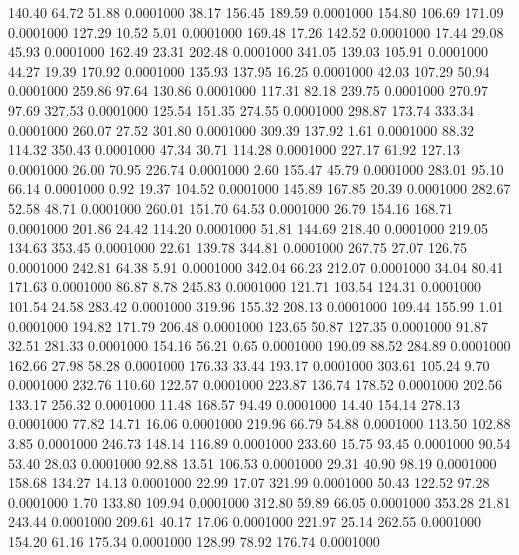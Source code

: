  140.40   64.72   51.88   0.0001000
  38.17  156.45  189.59   0.0001000
 154.80  106.69  171.09   0.0001000
 127.29   10.52    5.01   0.0001000
 169.48   17.26  142.52   0.0001000
  17.44   29.08   45.93   0.0001000
 162.49   23.31  202.48   0.0001000
 341.05  139.03  105.91   0.0001000
  44.27   19.39  170.92   0.0001000
 135.93  137.95   16.25   0.0001000
  42.03  107.29   50.94   0.0001000
 259.86   97.64  130.86   0.0001000
 117.31   82.18  239.75   0.0001000
 270.97   97.69  327.53   0.0001000
 125.54  151.35  274.55   0.0001000
 298.87  173.74  333.34   0.0001000
 260.07   27.52  301.80   0.0001000
 309.39  137.92    1.61   0.0001000
  88.32  114.32  350.43   0.0001000
  47.34   30.71  114.28   0.0001000
 227.17   61.92  127.13   0.0001000
  26.00   70.95  226.74   0.0001000
   2.60  155.47   45.79   0.0001000
 283.01   95.10   66.14   0.0001000
   0.92   19.37  104.52   0.0001000
 145.89  167.85   20.39   0.0001000
 282.67   52.58   48.71   0.0001000
 260.01  151.70   64.53   0.0001000
  26.79  154.16  168.71   0.0001000
 201.86   24.42  114.20   0.0001000
  51.81  144.69  218.40   0.0001000
 219.05  134.63  353.45   0.0001000
  22.61  139.78  344.81   0.0001000
 267.75   27.07  126.75   0.0001000
 242.81   64.38    5.91   0.0001000
 342.04   66.23  212.07   0.0001000
  34.04   80.41  171.63   0.0001000
  86.87    8.78  245.83   0.0001000
 121.71  103.54  124.31   0.0001000
 101.54   24.58  283.42   0.0001000
 319.96  155.32  208.13   0.0001000
 109.44  155.99    1.01   0.0001000
 194.82  171.79  206.48   0.0001000
 123.65   50.87  127.35   0.0001000
  91.87   32.51  281.33   0.0001000
 154.16   56.21    0.65   0.0001000
 190.09   88.52  284.89   0.0001000
 162.66   27.98   58.28   0.0001000
 176.33   33.44  193.17   0.0001000
 303.61  105.24    9.70   0.0001000
 232.76  110.60  122.57   0.0001000
 223.87  136.74  178.52   0.0001000
 202.56  133.17  256.32   0.0001000
  11.48  168.57   94.49   0.0001000
  14.40  154.14  278.13   0.0001000
  77.82   14.71   16.06   0.0001000
 219.96   66.79   54.88   0.0001000
 113.50  102.88    3.85   0.0001000
 246.73  148.14  116.89   0.0001000
 233.60   15.75   93.45   0.0001000
  90.54   53.40   28.03   0.0001000
  92.88   13.51  106.53   0.0001000
  29.31   40.90   98.19   0.0001000
 158.68  134.27   14.13   0.0001000
  22.99   17.07  321.99   0.0001000
  50.43  122.52   97.28   0.0001000
   1.70  133.80  109.94   0.0001000
 312.80   59.89   66.05   0.0001000
 353.28   21.81  243.44   0.0001000
 209.61   40.17   17.06   0.0001000
 221.97   25.14  262.55   0.0001000
 154.20   61.16  175.34   0.0001000
 128.99   78.92  176.74   0.0001000
